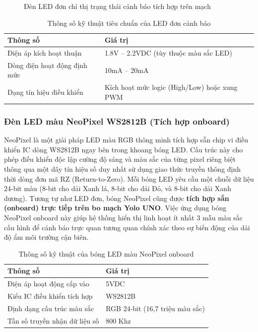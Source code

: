 \begin{figure}[H]
    \centering
    \caption{Đèn LED đơn chỉ thị trạng thái cảnh báo tích hợp trên mạch}
    \label{fig:led_single}
\end{figure}

\begin{table}[H]
    \centering
    \caption{Thông số kỹ thuật tiêu chuẩn của LED đơn cảnh báo}
    \begin{tabular}{|l|l|}
    \hline
    \textbf{Thông số} & \textbf{Giá trị} \\ \hline
    Điện áp kích hoạt thuận & 1.8V -- 2.2VDC (tùy thuộc màu sắc LED) \\ \hline
    Dòng điện hoạt động định mức & 10mA -- 20mA \\ \hline
    Dạng tín hiệu điều khiển & Kích hoạt mức logic (High/Low) hoặc xung PWM \\ \hline
    \end{tabular}
\end{table}

\subsubsection{Đèn LED màu NeoPixel WS2812B (Tích hợp onboard)}
NeoPixel là một giải pháp LED màu RGB thông minh tích hợp sẵn chip vi điều khiển IC dòng WS2812B ngay bên trong khoang bóng LED. Cấu trúc này cho phép điều khiển độc lập cường độ sáng và màu sắc của từng pixel riêng biệt thông qua một dây tín hiệu số duy nhất sử dụng giao thức truyền thông định thời dòng đơn mã RZ (Return-to-Zero). Mỗi bóng LED yêu cầu một chuỗi dữ liệu 24-bit màu (8-bit cho dải Xanh lá, 8-bit cho dải Đỏ, và 8-bit cho dải Xanh dương). Tương tự như LED đơn, bóng NeoPixel cũng được \textbf{tích hợp sẵn (onboard) trực tiếp trên bo mạch Yolo UNO}. Việc ứng dụng bóng NeoPixel onboard này giúp hệ thống hiển thị linh hoạt ít nhất 3 mẫu màu sắc cấu hình để cảnh báo trực quan tương quan chính xác theo sự biến động của dải độ ẩm môi trường cận biên.

\begin{table}[H]
    \centering
    \caption{Thông số kỹ thuật của bóng LED màu NeoPixel onboard}
    \begin{tabular}{|l|l|}
    \hline
    \textbf{Thông số} & \textbf{Giá trị} \\ \hline
    Điện áp hoạt động cấp vào & 5VDC \\ \hline
    Kiểu IC điều khiển tích hợp & WS2812B \\ \hline
    Định dạng cấu trúc màu sắc & RGB 24-bit (16,7 triệu màu sắc) \\ \hline
    Tần số truyền nhận dữ liệu số & 800 Khz \\ \hline
    \end{tabular}
\end{table}

